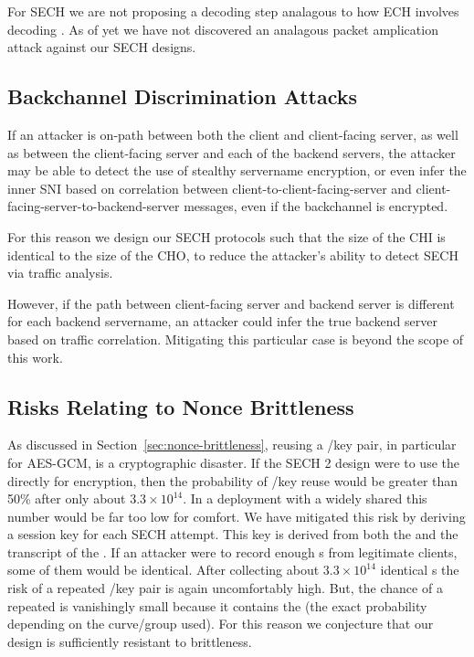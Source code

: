 For \ac{SECH} we are not proposing a decoding step analagous to how \ac{ECH} involves decoding .
As of yet we have not discovered an analagous packet amplication
attack against our \ac{SECH} designs.

\subsection{Backchannel Discrimination Attacks}
If an attacker is on-path between both the client and client-facing server,
as well as between the client-facing server and each of the backend servers,
the attacker may be able to detect the use of stealthy servername encryption,
or even infer the inner \ac{SNI} based on correlation
between client-to-client-facing-server and client-facing-server-to-backend-server
messages,
even if the backchannel is encrypted.

For this reason we design our \ac{SECH} protocols
such that the size of the \ac{CHI} is identical to the size of the \ac{CHO},
to reduce the attacker's ability to detect \ac{SECH} via traffic analysis.

However, if the path between client-facing server and backend server is different for each backend servername,
an attacker could infer the true backend server based on traffic correlation.
Mitigating this particular case is beyond the scope of this work.

\subsection{Risks Relating to Nonce Brittleness}
As discussed in Section~\ref{sec:nonce-brittleness},
reusing a \nonce/key pair,
in particular for \ac{AES}-\ac{GCM},
is a cryptographic disaster.
If the \ac{SECH} 2 design were to use the
\varsechlongtermkey{} directly for encryption,
then the probability of \nonce/key reuse would
be greater than 50\% after only about $3.3\times 10^{14}$.
In a deployment with a widely shared \varsechlongtermkey{}
this number would be far too low for comfort.
We have mitigated this risk by deriving a session
key for each \ac{SECH} attempt.
This key is derived from both the \varsechlongtermkey{}
and the transcript of the .
If an attacker were to record enough s from legitimate clients,
some of them would be identical.
After collecting about $3.3\times 10^{14}$ identical
s the risk of a repeated
\nonce/key pair is again uncomfortably high.
But, the chance of a repeated 
is vanishingly small because it contains the 
(the exact probability depending on the curve/group used).
For this reason we conjecture that our design is
sufficiently resistant to \nonce brittleness.

